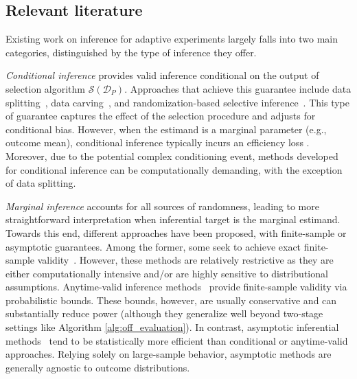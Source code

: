 \documentclass[12pt]{article}
\begin{document}
\subsection{Relevant literature}

Existing work on inference for adaptive experiments largely falls into two main categories, distinguished by the type of inference they offer.

\textit{Conditional inference} provides valid inference conditional on the output of selection algorithm $\mathcal{S}(\mathcal{D}_P)$. Approaches that achieve this guarantee include data splitting~\citep{cox1975note}, 
data carving~\citep{fithian2014optimal,chen2023optimal}, and randomization-based selective inference~\citep{freidling2024selective}. This type of guarantee captures the effect of the selection procedure and adjusts for conditional bias. However, when the estimand is a marginal parameter (e.g., outcome mean), conditional inference typically incurs an efficiency loss \citep{hu2006theory,marschner2021general}. Moreover, due to the potential complex conditioning event, methods developed for conditional inference can be computationally demanding, with the exception of data splitting. 

\textit{Marginal inference} accounts for all sources of randomness, leading to more straightforward interpretation when inferential target is the marginal estimand. 
Towards this end, different approaches have been proposed, with finite-sample or asymptotic guarantees. 
Among the former, some seek to achieve exact finite-sample validity~\citep{sampson2005drop,sill2009drop,wu2010interval,neal2011interval,Nair2023}. 
However, these methods are relatively restrictive as they are either computationally intensive and/or are highly sensitive to distributional assumptions. 
Anytime-valid inference methods~\citep{johari2015always,howard2021time,howard2022sequential,maharaj2023anytime,ramdas2023game,waudby2024estimating} provide finite-sample validity via probabilistic bounds. These bounds, however, are usually conservative and can substantially reduce power (although they generalize well beyond two-stage settings like Algorithm \ref{alg:off_evaluation}). In contrast, asymptotic inferential methods~\citep{Zhang2020,Hadad2021,lin2021inference,adusumilli2023optimal,Hirano2023} tend to be statistically more efficient than conditional or anytime-valid approaches. Relying solely on large-sample behavior, asymptotic methods are generally agnostic to outcome distributions.
\end{document}
